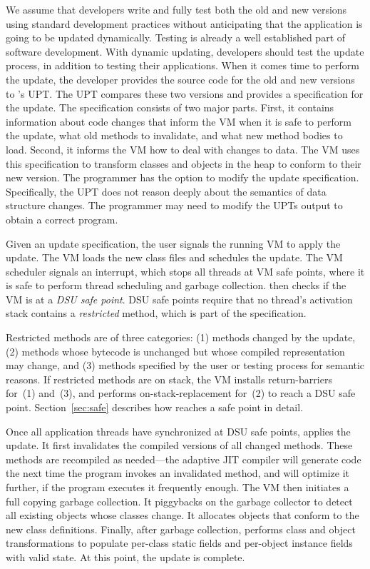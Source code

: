 We assume that developers write and fully test both the old and new
versions using standard development practices without anticipating that
the application is going to be updated dynamically. Testing is already a
well established part of software development. With dynamic updating,
developers should test the update process, in addition to testing their
applications.
When it comes time to
perform the update, the developer provides the source code for the old and
new versions to \JV's \acf{UPT}. The \acs{UPT} compares these two versions
and provides a specification for the update. The specification consists of
two major parts. First, it contains information about code changes that
inform the VM when it is safe to perform the update, what old
methods to invalidate, and what new method bodies to load. Second, it
informs the VM how to deal with changes to data. The VM uses this
specification to transform classes and objects in the heap to conform to
their new version. The programmer has the option to
modify the update specification. Specifically, the
\acs{UPT} does not reason deeply about the semantics of
data structure changes. The programmer may need to modify the \acs{UPT}s
output to obtain a correct program.

Given an update specification, the user
signals the running VM to apply the update.  The VM loads the new class
files and schedules the update. The VM scheduler signals an interrupt, which
stops all threads at VM safe points, where it is safe to perform thread
scheduling and garbage collection. \JV then checks if the VM is at a
\emph{DSU safe point}. DSU safe points require that no thread's activation
stack contains a \emph{restricted} method, which is part of the specification.

Restricted methods are of three categories: (1) methods changed by the
update, (2) methods whose bytecode is unchanged but whose compiled
representation may change, and (3) methods specified by the user or
testing process for semantic reasons. If
restricted methods are on stack, the VM installs return-barriers for~(1)
and~(3), and performs on-stack-replacement for~(2) to reach a DSU safe
point.  Section~\ref{sec:safe} describes how \JV reaches a safe point in
detail.

Once all application threads have synchronized at DSU safe points, \JV
applies the update. It first invalidates the compiled versions of all
changed methods.  These methods are recompiled as needed---the adaptive JIT
compiler will generate code the next time the program invokes an
invalidated method, and will optimize it further, if the program executes it
frequently enough.  The VM then initiates a full copying garbage collection. It
piggybacks on the garbage collector to detect all existing objects whose
classes change. It allocates objects that conform to the new class
definitions.
Finally, after garbage collection, \JV performs class and
object transformations to populate per-class static fields and per-object
instance fields with valid state.  At this point, the update is complete.
